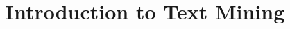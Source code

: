 \documentclass[xcolor=dvipsnames,compress,t,pdf,9pt]{beamer}
\title[\insertframenumber /\inserttotalframenumber]{Introduction to Text Mining}
\begin{document}
	\begin{frame}
	\titlepage
	\end{frame}
	
%	
	
	
\end{document}
